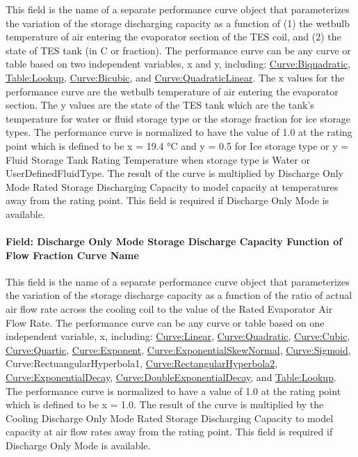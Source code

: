 This field is the name of a separate performance curve object that parameterizes the variation of the storage discharging capacity as a function of (1) the wetbulb temperature of air entering the evaporator section of the TES coil, and (2) the state of TES tank (in C or fraction). The performance curve can be any curve or table based on two independent variables, x and y, including: \hyperref[curvebiquadratic]{Curve:Biquadratic}, \hyperref[tablelookup]{Table:Lookup}, \hyperref[curvebicubic]{Curve:Bicubic}, and \hyperref[curvequadraticlinear]{Curve:QuadraticLinear}. The x values for the performance curve are the wetbulb temperature of air entering the evaporator section. The y values are the state of the TES tank which are the tank's temperature for water or fluid storage type or the storage fraction for ice storage types. The performance curve is normalized to have the value of 1.0 at the rating point which is defined to be x = 19.4 °C and y = 0.5 for Ice storage type or y = Fluid Storage Tank Rating Temperature when storage type is Water or UserDefinedFluidType. The result of the curve is multiplied by Discharge Only Mode Rated Storage Discharging Capacity to model capacity at temperatures away from the rating point. This field is required if Discharge Only Mode is available.

\paragraph{Field: Discharge Only Mode Storage Discharge Capacity Function of Flow Fraction Curve Name}\label{field-discharge-only-mode-storage-discharge-capacity-function-of-flow-fraction-curve-name}

This field is the name of a separate performance curve object that parameterizes the variation of the storage discharge capacity as a function of the ratio of actual air flow rate across the cooling coil to the value of the Rated Evaporator Air Flow Rate. The performance curve can be any curve or table based on one independent variable, x, including: \hyperref[curvelinear]{Curve:Linear}, \hyperref[curvequadratic]{Curve:Quadratic}, \hyperref[curvecubic]{Curve:Cubic}, \hyperref[curvequartic]{Curve:Quartic}, \hyperref[curveexponent]{Curve:Exponent}, \hyperref[curveexponentialskewnormal]{Curve:ExponentialSkewNormal}, \hyperref[curvesigmoid]{Curve:Sigmoid}, Curve:RectuangularHyperbola1, \hyperref[curverectangularhyperbola2]{Curve:RectangularHyperbola2}, \hyperref[curveexponentialdecay]{Curve:ExponentialDecay}, \hyperref[curvedoubleexponentialdecay]{Curve:DoubleExponentialDecay}, and \hyperref[tablelookup]{Table:Lookup}. The performance curve is normalized to have a value of 1.0 at the rating point which is defined to be x = 1.0. The result of the curve is multiplied by the Cooling Discharge Only Mode Rated Storage Discharging Capacity to model capacity at air flow rates away from the rating point. This field is required if Discharge Only Mode is available.

